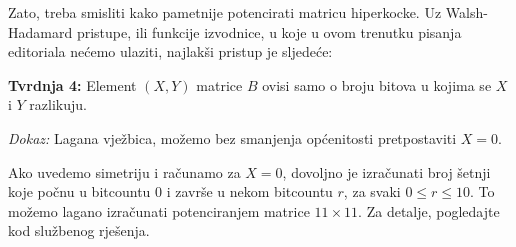 Zato, treba smisliti kako pametnije potencirati matricu hiperkocke.
Uz Walsh-Hadamard pristupe, ili funkcije izvodnice, u koje u ovom trenutku
pisanja editoriala nećemo ulaziti, najlakši pristup je sljedeće:

\textbf{Tvrdnja 4:} Element $(X, Y)$ matrice $B$ ovisi samo o broju
bitova u kojima se $X$ i $Y$ razlikuju.

\textit{Dokaz:} Lagana vježbica, možemo bez smanjenja općenitosti pretpostaviti
$X=0$.

Ako uvedemo simetriju i računamo za $X=0$, dovoljno je izračunati 
broj šetnji koje počnu u bitcountu $0$ i završe u nekom bitcountu $r$, za svaki
$0 \le r \le 10$. To možemo lagano izračunati potenciranjem matrice $11 \times
11$. 
Za detalje, pogledajte kod službenog rješenja.








